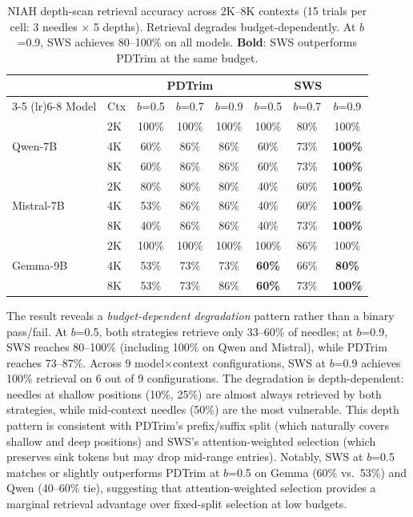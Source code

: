 \documentclass[11pt]{article}
\newcommand{\sws}{SWS}
\newcommand{\pct}{\%}
\theoremstyle{definition}
\theoremstyle{plain}
\begin{document}
\begin{table}[t]
\centering
\caption{NIAH depth-scan retrieval accuracy across 2K--8K contexts (15 trials per cell: 3 needles $\times$ 5 depths).  Retrieval degrades budget-dependently.  At $b$=0.9, \sws{} achieves 80--100\pct{} on all models.  \textbf{Bold}: \sws{} outperforms PDTrim at the same budget.}
\label{tab:niah}
\small
\begin{tabular}{llcccccc}
\toprule
& & \multicolumn{3}{c}{PDTrim} & \multicolumn{3}{c}{\sws{}} \\
\cmidrule(lr){3-5} \cmidrule(lr){6-8}
Model & Ctx & $b$=0.5 & $b$=0.7 & $b$=0.9 & $b$=0.5 & $b$=0.7 & $b$=0.9 \\
\midrule
\multirow{3}{*}{Qwen-7B} & 2K & 100\pct{} & 100\pct{} & 100\pct{} & 100\pct{} & 80\pct{} & 100\pct{} \\
& 4K & 60\pct{} & 86\pct{} & 86\pct{} & 60\pct{} & 73\pct{} & \textbf{100\pct{}} \\
& 8K & 60\pct{} & 86\pct{} & 86\pct{} & 60\pct{} & 73\pct{} & \textbf{100\pct{}} \\
\midrule
\multirow{3}{*}{Mistral-7B} & 2K & 80\pct{} & 80\pct{} & 80\pct{} & 40\pct{} & 60\pct{} & \textbf{100\pct{}} \\
& 4K & 53\pct{} & 86\pct{} & 86\pct{} & 40\pct{} & 60\pct{} & \textbf{100\pct{}} \\
& 8K & 40\pct{} & 86\pct{} & 86\pct{} & 40\pct{} & 73\pct{} & \textbf{100\pct{}} \\
\midrule
\multirow{3}{*}{Gemma-9B} & 2K & 100\pct{} & 100\pct{} & 100\pct{} & 100\pct{} & 86\pct{} & 100\pct{} \\
& 4K & 53\pct{} & 73\pct{} & 73\pct{} & \textbf{60\pct{}} & 66\pct{} & \textbf{80\pct{}} \\
& 8K & 53\pct{} & 73\pct{} & 86\pct{} & \textbf{60\pct{}} & 73\pct{} & \textbf{100\pct{}} \\
\bottomrule
\end{tabular}
\end{table}

The result reveals a \emph{budget-dependent degradation} pattern rather than a binary pass/fail.  At $b$=0.5, both strategies retrieve only 33--60\pct{} of needles; at $b$=0.9, \sws{} reaches 80--100\pct{} (including 100\pct{} on Qwen and Mistral), while PDTrim reaches 73--87\pct{}.  Across 9 model$\times$context configurations, \sws{} at $b$=0.9 achieves 100\pct{} retrieval on 6 out of 9 configurations.  The degradation is depth-dependent: needles at shallow positions (10\%, 25\%) are almost always retrieved by both strategies, while mid-context needles (50\%) are the most vulnerable.  This depth pattern is consistent with PDTrim's prefix/suffix split (which naturally covers shallow and deep positions) and \sws{}'s attention-weighted selection (which preserves sink tokens but may drop mid-range entries).  Notably, \sws{} at $b$=0.5 matches or slightly outperforms PDTrim at $b$=0.5 on Gemma (60\pct{} vs.\ 53\pct{}) and Qwen (40--60\pct{} tie), suggesting that attention-weighted selection provides a marginal retrieval advantage over fixed-split selection at low budgets.
\end{document}
